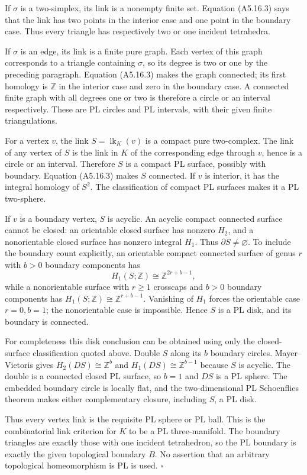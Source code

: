 If $\sigma$ is a two-simplex, its link is a nonempty finite set. Equation
(A5.16.3) says that the link has two points in the interior case and one point
in the boundary case. Thus every triangle has respectively two or one
incident tetrahedra.

If $\sigma$ is an edge, its link is a finite pure graph. Each vertex of this
graph corresponds to a triangle containing $\sigma$, so its degree is two
or one by the preceding paragraph. Equation (A5.16.3) makes the graph connected;
its first homology is $\mathbb Z$ in the interior case and zero in the
boundary case. A connected finite graph with all degrees one or two is
therefore a circle or an interval respectively. These are PL circles and
PL intervals, with their given finite triangulations.

For a vertex $v$, the link $S=\operatorname{lk}_K(v)$ is a compact pure
two-complex. The link of any vertex of $S$ is the link in $K$ of the
corresponding edge through $v$, hence is a circle or an interval. Therefore
$S$ is a compact PL surface, possibly with boundary. Equation (A5.16.3) makes
$S$ connected. If $v$ is interior, it has the integral homology of $S^2$.
The classification of compact PL surfaces makes it a PL two-sphere.

If $v$ is a boundary vertex, $S$ is acyclic. An acyclic compact connected
surface cannot be closed: an orientable closed surface has nonzero $H_2$,
and a nonorientable closed surface has nonzero integral $H_1$. Thus
$\partial S\ne\varnothing$. To include the boundary count explicitly, an
orientable compact connected surface of genus $r$ with $b>0$ boundary
components has
\[
 H_1(S;\mathbb Z)\cong\mathbb Z^{2r+b-1},
\]
while a nonorientable surface with $r\ge1$ crosscaps and $b>0$ boundary
components has $H_1(S;\mathbb Z)\cong\mathbb Z^{r+b-1}$.
Vanishing of $H_1$ forces the orientable case $r=0,b=1$; the nonorientable
case is impossible. Hence $S$ is a PL disk, and its boundary is connected.

For completeness this disk conclusion can be obtained using only the
closed-surface classification quoted above. Double $S$ along its $b$
boundary circles. Mayer--Vietoris gives $H_2(DS)\cong\mathbb Z^b$ and
$H_1(DS)\cong\mathbb Z^{b-1}$ because $S$ is acyclic. The double is a
connected closed PL surface, so $b=1$ and $DS$ is a PL sphere. The embedded
boundary circle is locally flat, and the two-dimensional PL Schoenflies
theorem makes either complementary closure, including $S$, a PL disk.

Thus every vertex link is the requisite PL sphere or PL ball. This is the
combinatorial link criterion for $K$ to be a PL three-manifold. The boundary
triangles are exactly those with one incident tetrahedron, so the PL boundary
is exactly the given topological boundary $B$. No assertion that an arbitrary
topological homeomorphism is PL is used. \hfill$\square$

